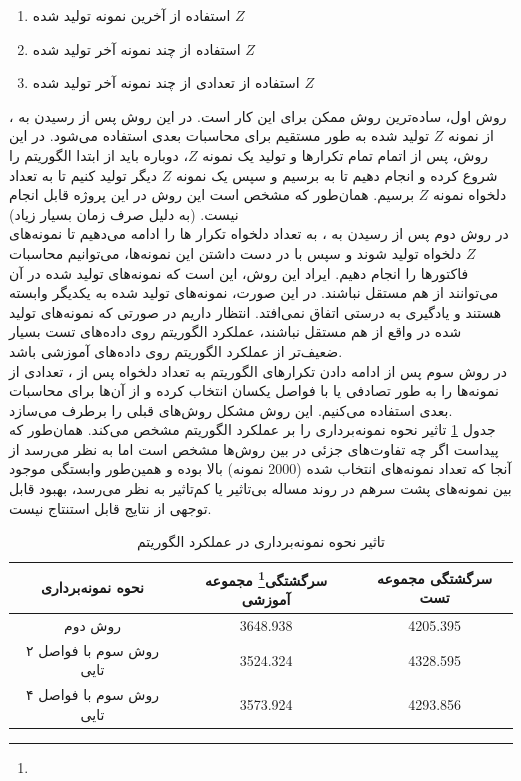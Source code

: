 \documentclass[11.5pt,a4paper]{article}
\newcommand{\enfootnote}[1]{\footnote{\lr{#1}}}
\begin{document}
\begin{enumerate}
\item 
استفاده از آخرین نمونه تولید شده $Z$
\item 
استفاده از چند نمونه آخر تولید شده $Z$
\item
استفاده از تعدادی از چند نمونه آخر تولید شده $Z$
\end{enumerate}

روش اول، ساده‌ترین روش ممکن برای این کار است. در این روش پس از رسیدن به ، از نمونه $Z$ تولید شده به طور مستقیم برای محاسبات بعدی استفاده می‌شود. در این روش، پس از اتمام تمام تکرارها و تولید یک نمونه $Z$، 
دوباره باید از ابتدا الگوریتم را شروع کرده و انجام دهیم تا به  برسیم و سپس یک نمونه $Z$ دیگر تولید کنیم تا به تعداد دلخواه نمونه $Z$ برسیم. همان‌طور که مشخص است این روش در این پروژه قابل انجام نیست. (به دلیل صرف زمان بسیار زیاد)
\\
 در روش دوم پس از رسیدن به ، به تعداد دلخواه تکرار ها را ادامه می‌دهیم تا نمونه‌های $Z$ دلخواه تولید شوند و سپس با در دست داشتن این نمونه‌ها، می‌توانیم محاسبات فاکتورها را انجام دهیم.
ایراد این روش، این است که نمونه‌های تولید شده در آن می‌توانند از هم مستقل نباشند. در این صورت، نمونه‌های تولید شده به یکدیگر وابسته هستند و یادگیری به درستی اتفاق نمی‌افتد. انتظار داریم در صورتی که نمونه‌های تولید شده در واقع از هم مستقل نباشند، عملکرد الگوریتم روی داده‌های تست بسیار ضعیف‌تر از عملکرد الگوریتم روی داده‌های آموزشی باشد.
\\
در روش سوم پس از ادامه دادن تکرار‌های الگوریتم به تعداد دلخواه پس از ، تعدادی از نمونه‌ها را به طور تصادفی یا با فواصل یکسان انتخاب کرده و از آن‌ها برای محاسبات بعدی استفاده می‌کنیم. این روش مشکل روش‌های قبلی را برطرف می‌سازد.
\\
جدول 
\ref{tbl:clusters}
تاثیر نحوه نمونه‌برداری را بر عملکرد الگوریتم مشخص می‌کند. همان‌طور که پیداست اگر چه تفاوت‌های جزئی در بین روش‌ها مشخص است اما به نظر می‌رسد از آنجا که تعداد نمونه‌های انتخاب شده (2000 نمونه) بالا بوده و همین‌طور وابستگی موجود بین نمونه‌های پشت سرهم در روند مساله بی‌تاثیر یا کم‌تاثیر به نظر می‌رسد، بهبود قابل توجهی از نتایج قابل استنتاج نیست.

\begin{table}[h]
\center
\caption{تاثیر نحوه نمونه‌برداری در عملکرد الگوریتم}
\label{tbl:clusters}
\begin{tabular}{c | c | c }
نحوه نمونه‌برداری & سرگشتگی\enfootnote{Perplexity} مجموعه آموزشی & سرگشتگی مجموعه تست\\
\hline
\hline
روش دوم & 3648.938 & 4205.395 \\
روش سوم  با فواصل ۲ تایی & 3524.324 & 4328.595 \\
روش سوم  با فواصل ۴ تایی & 3573.924 & 4293.856 \\
\end{tabular}
\end{table}
\end{document}
